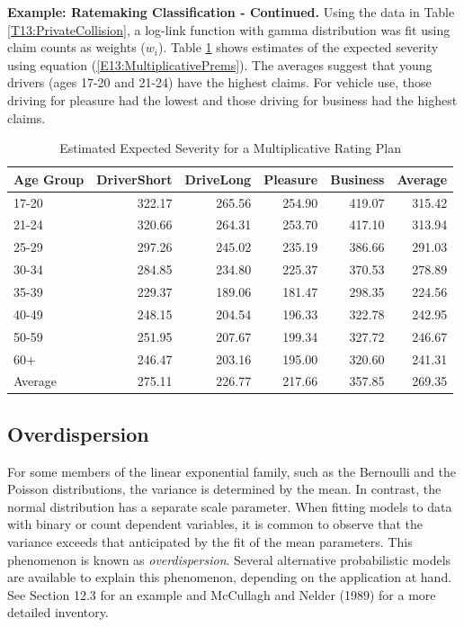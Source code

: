 \linejed

\textbf{Example: Ratemaking Classification - Continued.} Using the
data in Table \ref{T13:PrivateCollision}, a log-link function with
gamma distribution was fit using claim counts as weights ($w_i$).
Table \ref{T13:PrivateCollisionRates} shows estimates of the
expected severity using equation (\ref{E13:MultiplicativePrems}).
The averages suggest that young drivers (ages 17-20 and 21-24) have
the highest claims. For vehicle use, those driving for pleasure had
the lowest and those driving for business had the highest claims.

\begin{table}[h]
 \caption{\label{T13:PrivateCollisionRates} Estimated
Expected Severity for a Multiplicative Rating Plan}
\begin{tabular}{l|rrrr|r}
\hline
 Age Group   & DriverShort &  DriveLong &   Pleasure &   Business &    Average \\
\hline
     17-20 &     322.17 &     265.56 &     254.90 &     419.07 &     315.42 \\
     21-24 &     320.66 &     264.31 &     253.70 &     417.10 &     313.94 \\
     25-29 &     297.26 &     245.02 &     235.19 &     386.66 &     291.03 \\
     30-34 &     284.85 &     234.80 &     225.37 &     370.53 &     278.89 \\
     35-39 &     229.37 &     189.06 &     181.47 &     298.35 &     224.56 \\
     40-49 &     248.15 &     204.54 &     196.33 &     322.78 &     242.95 \\
     50-59 &     251.95 &     207.67 &     199.34 &     327.72 &     246.67 \\
       60+ &     246.47 &     203.16 &     195.00 &     320.60 &     241.31 \\
\hline
   Average &     275.11 &     226.77 &     217.66 &     357.85 &     269.35 \\
\hline
\end{tabular}

\linetjed
\end{table}


\subsection{Overdispersion}

For some members of the linear exponential family, such as the
Bernoulli and the Poisson distributions, the variance is determined
by the mean. In contrast, the normal distribution has a separate
scale parameter. When fitting models to data with binary or count
dependent variables, it is common to observe that the variance
exceeds that anticipated by the fit of the mean parameters. This
phenomenon is known as \emph{overdispersion}. Several alternative
probabilistic models are available to explain this phenomenon,
depending on the application at hand. See Section 12.3 for an
example and McCullagh and Nelder (1989) for a more detailed
inventory.

